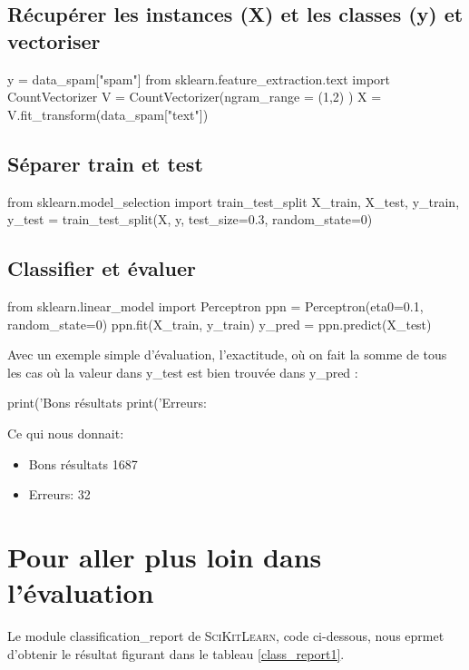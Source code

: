 \subsection*{Récupérer les instances (X) et les classes (y) et vectoriser}
\begin{python}
y = data_spam["spam"]
from sklearn.feature_extraction.text import CountVectorizer
V = CountVectorizer(ngram_range = (1,2) )
X = V.fit_transform(data_spam["text"])
\end{python}

\subsection*{Séparer train et test}

\begin{python}
from sklearn.model_selection import train_test_split
X_train, X_test, y_train, y_test = train_test_split(X, y, test_size=0.3, random_state=0)
\end{python}

\subsection*{Classifier et évaluer}


\begin{python}
from sklearn.linear_model import Perceptron
ppn = Perceptron(eta0=0.1, random_state=0)
ppn.fit(X_train, y_train)
y_pred = ppn.predict(X_test)
\end{python}

Avec un exemple simple d'évaluation, l'exactitude, où on fait la somme de tous les cas où la valeur dans y\_test est bien trouvée dans y\_pred :

\begin{python}
print('Bons résultats %
print('Erreurs: %
\end{python}

Ce qui nous donnait:
\begin{itemize}
  \item Bons résultats 1687
  \item Erreurs: 32
\end{itemize}

\section{Pour aller plus loin dans l'évaluation}

Le module classification\_report de \textsc{SciKitLearn}, code ci-dessous, nous eprmet d'obtenir le résultat figurant dans le tableau \ref{class_report1}.

